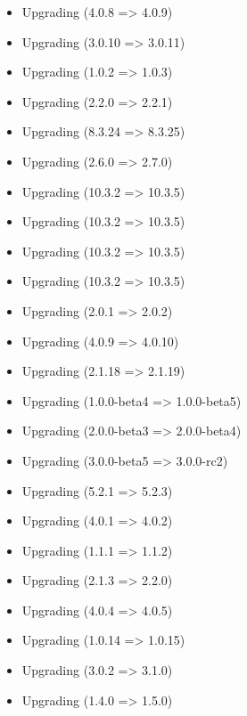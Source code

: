     \begin{itemize}
        \item Upgrading  (4.0.8 => 4.0.9)
        \item Upgrading  (3.0.10 => 3.0.11)
        \item Upgrading  (1.0.2 => 1.0.3)
        \item Upgrading  (2.2.0 => 2.2.1)
        \item Upgrading  (8.3.24 => 8.3.25)
        \item Upgrading  (2.6.0 => 2.7.0)
        \item Upgrading  (10.3.2 => 10.3.5)
        \item Upgrading  (10.3.2 => 10.3.5)
        \item Upgrading  (10.3.2 => 10.3.5)
        \item Upgrading  (10.3.2 => 10.3.5)
        \item Upgrading  (2.0.1 => 2.0.2)
        \item Upgrading  (4.0.9 => 4.0.10)
        \item Upgrading  (2.1.18 => 2.1.19)
        \item Upgrading  (1.0.0-beta4 => 1.0.0-beta5)
        \item Upgrading  (2.0.0-beta3 => 2.0.0-beta4)
        \item Upgrading  (3.0.0-beta5 => 3.0.0-rc2)
        \item Upgrading  (5.2.1 => 5.2.3)
        \item Upgrading  (4.0.1 => 4.0.2)
        \item Upgrading  (1.1.1 => 1.1.2)
        \item Upgrading  (2.1.3 => 2.2.0)
        \item Upgrading  (4.0.4 => 4.0.5)
        \item Upgrading  (1.0.14 => 1.0.15)
        \item Upgrading  (3.0.2 => 3.1.0)
        \item Upgrading  (1.4.0 => 1.5.0)

\end{itemize}
